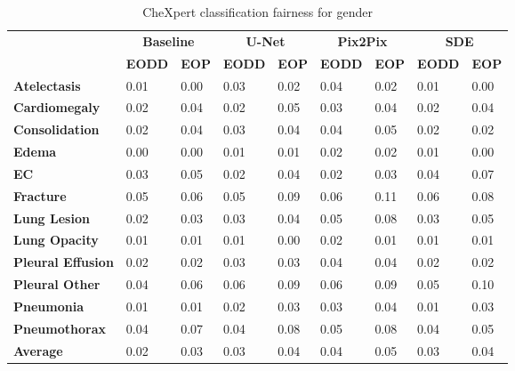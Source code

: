     \begin{table}[]
        \centering
        \caption{CheXpert classification fairness for gender}\label{tab:chex_gender}
        \begin{tabular}{l|llllllll}
        \hline
        \multirow{2}{*}{\textbf{}} & \multicolumn{2}{c|}{\textbf{Baseline}}                   & \multicolumn{2}{c|}{\textbf{U-Net}}                              & \multicolumn{2}{c|}{\textbf{Pix2Pix}}                              & \multicolumn{2}{c}{\textbf{SDE}}    \\ \cline{2-9}
                                                                                           & \textbf{EODD} & \textbf{EOP}  & \textbf{EODD} & \textbf{EOP}  & \textbf{EODD} & \textbf{EOP} & \textbf{EODD} & \textbf{EOP} \\ \hline
        \textbf{Atelectasis}  & 0.01 & 0.00 & 0.03 & 0.02 & 0.04 & 0.02 & 0.01 & 0.00 \\        
        \textbf{Cardiomegaly} & 0.02 & 0.04 & 0.02 & 0.05 & 0.03 & 0.04 & 0.02 & 0.04 \\
        \textbf{Consolidation} & 0.02 & 0.04 & 0.03 & 0.04 & 0.04 & 0.05 & 0.02 & 0.02 \\
        \textbf{Edema} & 0.00 & 0.00 & 0.01 & 0.01 & 0.02 & 0.02 & 0.01 & 0.00 \\
        \textbf{EC} & 0.03 & 0.05 & 0.02 & 0.04 & 0.02 & 0.03 & 0.04 & 0.07 \\
        \textbf{Fracture} & 0.05 & 0.06 & 0.05 & 0.09 & 0.06 & 0.11 & 0.06 & 0.08 \\
        \textbf{Lung Lesion} & 0.02 & 0.03 & 0.03 & 0.04 & 0.05 & 0.08 & 0.03 & 0.05 \\
        \textbf{Lung Opacity} & 0.01 & 0.01 & 0.01 & 0.00 & 0.02 & 0.01 & 0.01 & 0.01 \\
        \textbf{Pleural Effusion} & 0.02 & 0.02 & 0.03 & 0.03 & 0.04 & 0.04 & 0.02 & 0.02 \\
        \textbf{Pleural Other} & 0.04 & 0.06 & 0.06 & 0.09 & 0.06 & 0.09 & 0.05 & 0.10 \\
        \textbf{Pneumonia} & 0.01 & 0.01 & 0.02 & 0.03 & 0.03 & 0.04 & 0.01 & 0.03 \\
        \textbf{Pneumothorax} & 0.04 & 0.07 & 0.04 & 0.08 & 0.05 & 0.08 & 0.04 & 0.05 \\
        \textbf{Average} & 0.02 & 0.03 & 0.03 & 0.04 & 0.04 & 0.05 & 0.03 & 0.04 \\ \hline
        \end{tabular}
        \end{table}
    
